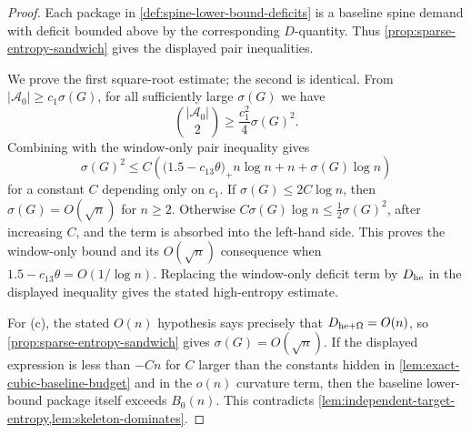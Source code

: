 \documentclass[11pt]{article}
\begin{document}
\begin{proof}
Each package in \cref{def:spine-lower-bound-deficits} is a baseline spine
demand with deficit bounded above by the corresponding \(D\)-quantity.  Thus
\cref{prop:sparse-entropy-sandwich} gives the displayed pair inequalities.

We prove the first square-root estimate; the second is identical.  From
\(|\mathcal A_0|\ge c_1\sigma(G)\), for all sufficiently large \(\sigma(G)\)
we have
\[
\binom{|\mathcal A_0|}{2}\ge \frac{c_1^2}{4}\sigma(G)^2.
\]
Combining with the window-only pair inequality gives
\[
\sigma(G)^2
\le
C\left(
\bigl(1.5-c_{13}\theta\bigr)_+n\log n+n+\sigma(G)\log n
\right)
\]
for a constant \(C\) depending only on \(c_1\).  If
\(\sigma(G)\le2C\log n\), then \(\sigma(G)=O(\sqrt n)\) for \(n\ge2\).  Otherwise
\(C\sigma(G)\log n\le\frac12\sigma(G)^2\), after increasing \(C\), and the
term is absorbed into the left-hand side.  This proves the window-only bound
and its \(O(\sqrt n)\) consequence when
\(1.5-c_{13}\theta=O(1/\log n)\).  Replacing the window-only deficit term by
\(D_{\rm he}\) in the displayed inequality gives the stated high-entropy
estimate.

For (c), the stated \(O(n)\) hypothesis says precisely that
\(D_{\rm he+\Omega}=O(n)\), so
\cref{prop:sparse-entropy-sandwich} gives \(\sigma(G)=O(\sqrt n)\).  If the
displayed expression is less than \(-Cn\) for \(C\) larger than the constants
hidden in \cref{lem:exact-cubic-baseline-budget} and in the \(o(n)\) curvature
term, then the baseline lower-bound package itself exceeds \(B_0(n)\).  This
contradicts \cref{lem:independent-target-entropy,lem:skeleton-dominates}.
\end{proof}
\end{document}
